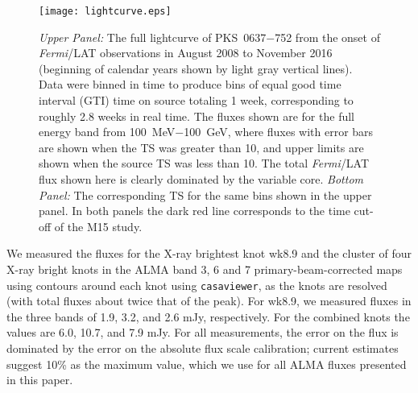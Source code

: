\documentclass[twocolumn]{aastex61}
\begin{document}
\begin{figure}[t]
\vspace{20pt}
\begin{center}
\texttt{[image: lightcurve.eps]}
\end{center}
\caption{\label{fig:lightcurve} \emph{Upper Panel:} The full
  lightcurve of PKS~0637$-$752 from the onset of \emph{Fermi}/LAT
  observations in August 2008 to November 2016 (beginning of calendar
  years shown by light gray vertical lines). Data were binned in time
  to produce bins of equal good time interval (GTI) time on source
  totaling 1 week, corresponding to roughly 2.8 weeks in real time.
  The fluxes shown are for the full energy band from
  100~MeV$-$100~GeV, where fluxes with error bars are shown when the
  TS was greater than 10, and upper limits are shown when the source
  TS was less than 10. The total \emph{Fermi}/LAT flux shown here is
  clearly dominated by the variable core. \emph{Bottom Panel:} The
  corresponding TS for the same bins shown in the upper panel. In both
  panels the dark red line corresponds to the time cut-off of the M15
  study.}
\end{figure}

We measured the fluxes for the X-ray brightest knot wk8.9 and the
cluster of four X-ray bright knots in the ALMA band 3, 6 and 7
primary-beam-corrected maps using contours around each knot using
\texttt{casaviewer}, as the knots are resolved (with total fluxes
about twice that of the peak). For wk8.9, we measured fluxes in the
three bands of 1.9, 3.2, and 2.6 mJy, respectively.  For the combined
knots the values are 6.0, 10.7, and 7.9 mJy. For all measurements, the
error on the flux is dominated by the error on the absolute flux scale
calibration; current estimates suggest 10\% as the maximum value,
which we use for all ALMA fluxes presented in this paper.
\end{document}
